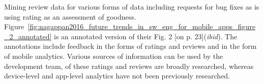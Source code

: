 Mining review data for various forms of data including requests for bug fixes as is using rating as an assessment of goodness. 
Figure~\ref{fig:nagappan2016_future_trends_in_sw_eng_for_mobile_apps_figure_2_annotated} is an annotated version of their Fig. 2 [on p. 23](\textit{ibid}). The annotations include feedback in the forms of ratings and reviews and in the form of mobile analytics. Various sources of information can be used by the development team, of these ratings and reviews are broadly researched, whereas device-level and app-level analytics have not been previously researched.


